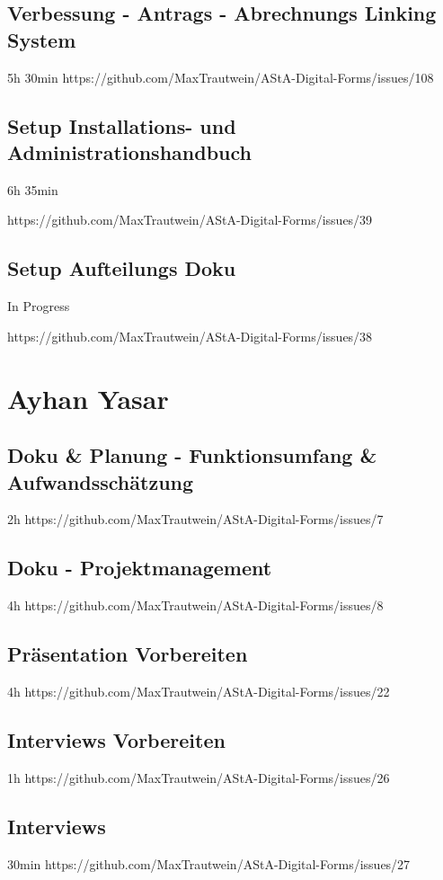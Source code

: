 \subsection{Verbessung - Antrags - Abrechnungs Linking System}
5h 30min
https://github.com/MaxTrautwein/AStA-Digital-Forms/issues/108
\subsection{Setup Installations- und Administrationshandbuch}
6h 35min

https://github.com/MaxTrautwein/AStA-Digital-Forms/issues/39
\subsection{Setup Aufteilungs Doku}
In Progress

https://github.com/MaxTrautwein/AStA-Digital-Forms/issues/38

\section{Ayhan Yasar}\label{sec:ayhan-yasar}

\subsection{Doku & Planung - Funktionsumfang & Aufwandsschätzung}
2h
https://github.com/MaxTrautwein/AStA-Digital-Forms/issues/7

\subsection{Doku - Projektmanagement}
4h
https://github.com/MaxTrautwein/AStA-Digital-Forms/issues/8


\subsection{Präsentation Vorbereiten}
4h
https://github.com/MaxTrautwein/AStA-Digital-Forms/issues/22
\subsection{Interviews Vorbereiten}
1h
https://github.com/MaxTrautwein/AStA-Digital-Forms/issues/26
\subsection{Interviews}
30min
https://github.com/MaxTrautwein/AStA-Digital-Forms/issues/27
